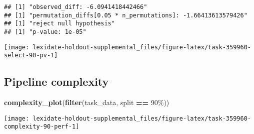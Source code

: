 \documentclass[
]{book}
\newenvironment{Shaded}{\begin{snugshade}}{\end{snugshade}}
\newcommand{\AttributeTok}[1]{\textcolor[rgb]{0.13,0.29,0.53}{#1}}
\newcommand{\DecValTok}[1]{\textcolor[rgb]{0.00,0.00,0.81}{#1}}
\newcommand{\FunctionTok}[1]{\textcolor[rgb]{0.13,0.29,0.53}{\textbf{#1}}}
\newcommand{\NormalTok}[1]{#1}
\newcommand{\OtherTok}[1]{\textcolor[rgb]{0.56,0.35,0.01}{#1}}
\newcommand{\SpecialCharTok}[1]{\textcolor[rgb]{0.81,0.36,0.00}{\textbf{#1}}}
\newcommand{\StringTok}[1]{\textcolor[rgb]{0.31,0.60,0.02}{#1}}
\begin{document}
\begin{Shaded}
\end{Shaded}

\begin{verbatim}
## [1] "observed_diff: -6.0941418442466"
## [1] "permutation_diffs[0.05 * n_permutations]: -1.66413613579426"
## [1] "reject null hypothesis"
## [1] "p-value: 1e-05"
\end{verbatim}

\texttt{[image: lexidate-holdout-supplemental\_files/figure-latex/task-359960-select-90-pv-1]}

\hypertarget{pipeline-complexity-46}{%
\subsection{Pipeline complexity}\label{pipeline-complexity-46}}

\begin{Shaded}
\begin{Highlighting}[]
\FunctionTok{complexity\_plot}\NormalTok{(}\FunctionTok{filter}\NormalTok{(task\_data, split }\SpecialCharTok{==} \StringTok{\textquotesingle{}90\%\textquotesingle{}}\NormalTok{))}
\end{Highlighting}
\end{Shaded}

\texttt{[image: lexidate-holdout-supplemental\_files/figure-latex/task-359960-complexity-90-perf-1]}
\end{document}
